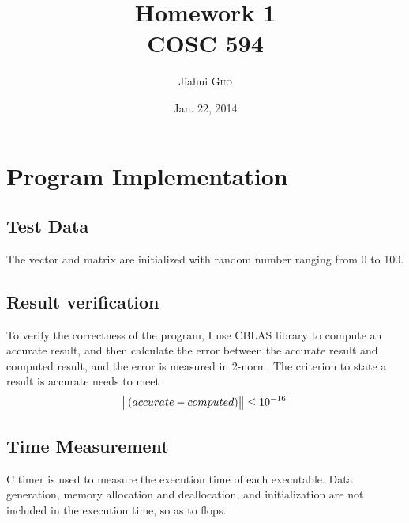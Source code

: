 \documentclass{article}
\title{ Homework 1 \\ COSC 594} %
\author{Jiahui \textsc{Guo}} %
\date{Jan. 22, 2014} %
\begin{document}
\maketitle %



\section{Program Implementation}

\subsection{Test Data}
The vector and matrix are initialized with random number ranging from 0 to 100. 
\subsection{Result verification}
To verify the correctness of the program, I use CBLAS library to compute an accurate result, 
and then calculate the error between the accurate result and computed result, and the error is
measured in 2-norm. The criterion to state a result is accurate needs to meet
\begin{equation*}
    \norm{(accurate-computed)}\le10^{-16}
\end{equation*}

\subsection{Time Measurement}
C timer is used to measure the execution time of each executable. Data generation, memory allocation
and deallocation, and initialization are not included in the execution time, so as to flops.
\end{document}
